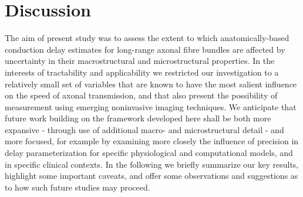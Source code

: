 

\section{Discussion}








The aim of present study was to assess the extent to which anatomically-based conduction delay estimates for long-range axonal fibre bundles are affected by uncertainty in their macrostructural and microstructural properties. In the interests of tractability and applicability we restricted our investigation to a relatively small set of variables that are known to have the most salient influence on the speed of axonal transmission, and that also present the possibility of measurement using emerging noninvasive imaging techniques. We anticipate that future work building on the framework developed here shall be both more expansive - through use of additional macro- and microstructural detail - and more focused, for example by examining more closely the influence of precision in delay parameterization for specific physiological and computational models, and in specific clinical contexts. In the following we briefly summarize our key results, highlight some important caveats, and offer some observations and suggestions as to how such future studies may proceed.


